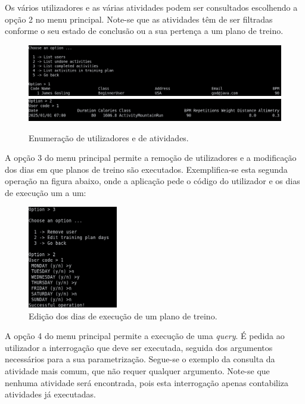 \documentclass[12pt, a4paper]{article}
\begin{document}
Os vários utilizadores e as várias atividades podem ser consultados escolhendo a opção 2 no menu
principal. Note-se que as atividades têm de ser filtradas conforme o seu estado de conclusão ou a
sua pertença a um plano de treino. \\

\begin{figure}[H]
    \centering
    \includegraphics[width=\textwidth]{ListUsers.png}
    \includegraphics[width=\textwidth]{ListActivities.png}
    \caption{Enumeração de utilizadores e de atividades.}
\end{figure}

A opção 3 do menu principal permite a remoção de utilizadores e a modificação dos dias em que planos
de treino são executados. Exemplifica-se esta segunda operação na figura abaixo, onde a aplicação
pede o código do utilizador e os dias de execução um a um: \\

\begin{figure}[H]
    \centering
    \includegraphics[width=0.35\textwidth]{EditTrainingPlan.png}
    \caption{Edição dos dias de execução de um plano de treino.}
\end{figure}

A opção 4 do menu principal permite a execução de uma \emph{query}. É pedida ao utilizador a
interrogação que deve ser executada, seguida dos argumentos necessários para a sua parametrização.
Segue-se o exemplo da consulta da atividade mais comum, que não requer qualquer argumento. Note-se
que nenhuma atividade será encontrada, pois esta interrogação apenas contabiliza atividades já
executadas. \\
\end{document}
